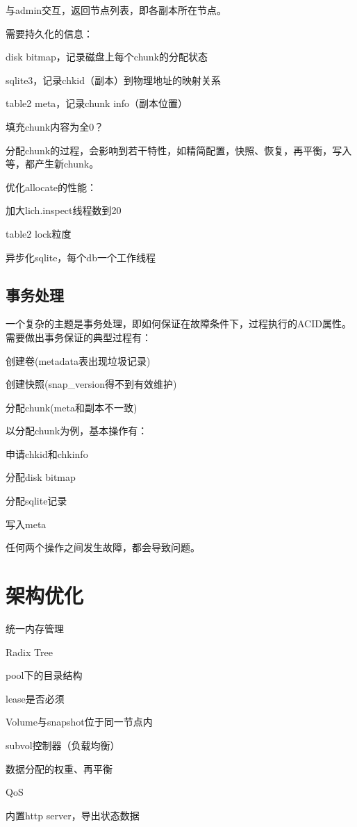 与admin交互，返回节点列表，即各副本所在节点。

需要持久化的信息：
\begin{compactitem}
\item disk bitmap，记录磁盘上每个chunk的分配状态
\item sqlite3，记录chkid（副本）到物理地址的映射关系
\item table2 meta，记录chunk info（副本位置）
\item 填充chunk内容为全0？
\end{compactitem}

分配chunk的过程，会影响到若干特性，如精简配置，快照、恢复，再平衡，写入等，都产生新chunk。

优化allocate的性能：
\begin{compactitem}
\item 加大lich.inspect线程数到20
\item table2 lock粒度 
\item 异步化sqlite，每个db一个工作线程
\end{compactitem}

\subsection{事务处理}

一个复杂的主题是事务处理，即如何保证在故障条件下，过程执行的ACID属性。
需要做出事务保证的典型过程有：
\begin{compactenum}
\item 创建卷(metadata表出现垃圾记录)
\item 创建快照(snap\_version得不到有效维护)
\item 分配chunk(meta和副本不一致)
\end{compactenum}

以分配chunk为例，基本操作有：
\begin{compactenum}
\item 申请chkid和chkinfo
\item 分配disk bitmap
\item 分配sqlite记录
\item 写入meta
\end{compactenum}

任何两个操作之间发生故障，都会导致问题。

\section{架构优化}

\begin{enumbox}
\item 统一内存管理
\item Radix Tree
\item pool下的目录结构
\item lease是否必须
\item Volume与snapshot位于同一节点内
\item subvol控制器（负载均衡）
\item 数据分配的权重、再平衡
\item QoS
\item 内置http server，导出状态数据
\end{enumbox}
